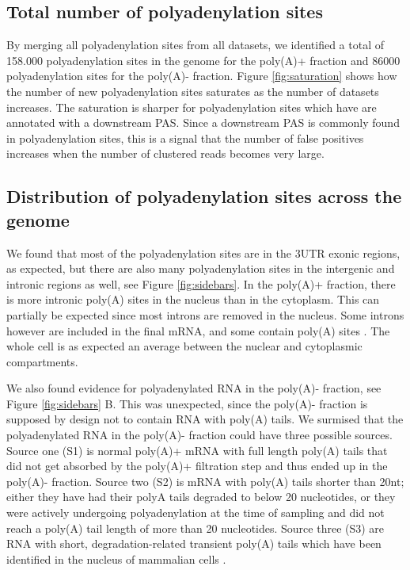 \subsection{Total number of polyadenylation sites}
By merging all polyadenylation sites from all datasets, we identified a total
of 158.000 polyadenylation sites in the genome for the poly(A)+ fraction and
86000 polyadenylation sites for the poly(A)- fraction. Figure
\ref{fig:saturation} shows how the number of new polyadenylation sites
saturates as the number of datasets increases. The saturation is sharper for
polyadenylation sites which have are annotated with a downstream PAS. Since a
downstream PAS is commonly found in polyadenylation sites, this is a signal
that the number of false positives increases when the number of clustered reads
becomes very large.

\subsection{Distribution of polyadenylation sites across the genome}
We found that most of the polyadenylation sites are in the 3\p UTR exonic
regions, as expected, but there are also many polyadenylation sites in the
intergenic and intronic regions as well, see Figure \ref{fig:sidebars}. In the
poly(A)+ fraction, there is more intronic poly(A) sites in the nucleus than in
the cytoplasm. This can partially be expected since most introns are removed in
the nucleus. Some introns however are included in the final mRNA, and some
contain poly(A) sites \cite{tian_widespread_2007}. The whole cell is as
expected an average between the nuclear and cytoplasmic compartments.

We also found evidence for polyadenylated RNA in the poly(A)- fraction, see
Figure \ref{fig:sidebars} B. This was unexpected, since the poly(A)- fraction
is supposed by design not to contain RNA with poly(A) tails. We surmised that
the polyadenylated RNA in the poly(A)- fraction could have three possible
sources. Source one (S1) is normal poly(A)+ mRNA with full length poly(A) tails
that did not get absorbed by the poly(A)+ filtration step and thus ended up in
the poly(A)- fraction. Source two (S2) is mRNA with poly(A) tails shorter than
20nt; either they have had their polyA tails degraded to below 20 nucleotides,
or they were actively undergoing polyadenylation at the time of sampling and
did not reach a poly(A) tail length of more than 20 nucleotides. Source three
(S3) are RNA with short, degradation-related transient poly(A) tails which have
been identified in the nucleus of mammalian cells \cite{lemay_nuclear_2010}.

